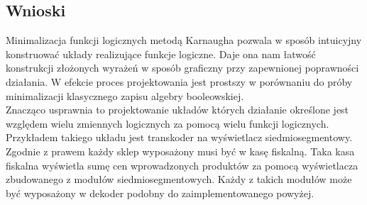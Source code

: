 \documentclass{article}
\begin{document}
        \subsection{Wnioski}
            Minimalizacja funkcji logicznych metodą Karnaugha pozwala  w sposób intuicyjny konstruować układy realizujące funkcje logiczne. Daje ona nam łatwość konstrukcji złożonych wyrażeń w sposób graficzny przy zapewnionej poprawności działania. W efekcie proces projektowania jest prostszy w porównaniu do próby minimalizacji klasycznego zapisu algebry booleowskiej.\\
            Znacząco usprawnia to projektowanie układów których działanie określone jest względem wielu zmiennych logicznych za pomocą wielu funkcji logicznych. Przykładem takiego układu jest transkoder na wyświetlacz siedmiosegmentowy.\\
            Zgodnie z prawem każdy sklep wyposażony musi być w kasę fiskalną. Taka kasa fiskalna wyświetla sumę cen wprowadzonych produktów za pomocą wyświetlacza zbudowanego z modułów siedmiosegmentowych. Każdy z takich modułów może być wyposażony w dekoder podobny do zaimplementowanego powyżej.
\end{document}

